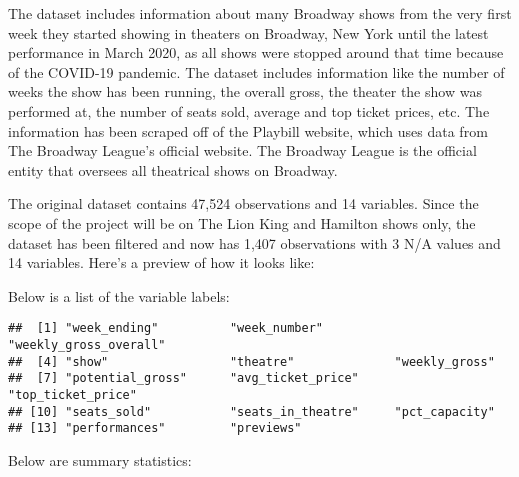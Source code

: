 \documentclass[
]{article}
\begin{document}
The dataset includes information about many Broadway shows from the very first week they started showing in theaters on Broadway, New York until the latest performance in March 2020, as all shows were stopped around that time because of the COVID-19 pandemic. The dataset includes information like the number of weeks the show has been running, the overall gross, the theater the show was performed at, the number of seats sold, average and top ticket prices, etc. The information has been scraped off of the Playbill website, which uses data from The Broadway League's official website. The Broadway League is the official entity that oversees all theatrical shows on Broadway.

The original dataset contains 47,524 observations and 14 variables. Since the scope of the project will be on The Lion King and Hamilton shows only, the dataset has been filtered and now has 1,407 observations with 3 N/A values and 14 variables. Here's a preview of how it looks like:

\begin{table}

\caption{\label{tab:previewofdataset}}
\centering
{}
\end{table}

Below is a list of the variable labels:

\begin{verbatim}
##  [1] "week_ending"          "week_number"          "weekly_gross_overall"
##  [4] "show"                 "theatre"              "weekly_gross"        
##  [7] "potential_gross"      "avg_ticket_price"     "top_ticket_price"    
## [10] "seats_sold"           "seats_in_theatre"     "pct_capacity"        
## [13] "performances"         "previews"
\end{verbatim}

Below are summary statistics:
\end{document}
